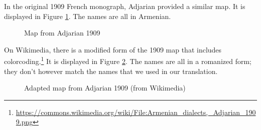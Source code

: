 In the original 1909 French monograph, Adjarian provided a similar map. It   is displayed in Figure \ref{map:Adjarian1909}. The names are all in Armenian. 

\begin{figure}[H]
	\caption{Map from Adjarian 1909}
	\label{map:Adjarian1909}
\end{figure}

On Wikimedia, there is a modified form of the 1909 map that includes colorcoding.\footnote{\url{https://commons.wikimedia.org/wiki/File:Armenian_dialects,_Adjarian_1909.png}} It   is displayed in Figure \ref{map:Adjarian1909color}. The names are all in a romanized form; they don't however match the names that we used in our translation. 



\begin{figure}[H]
	\caption{Adapted map from Adjarian 1909 (from Wikimedia)}
	\label{map:Adjarian1909color}
\end{figure}


